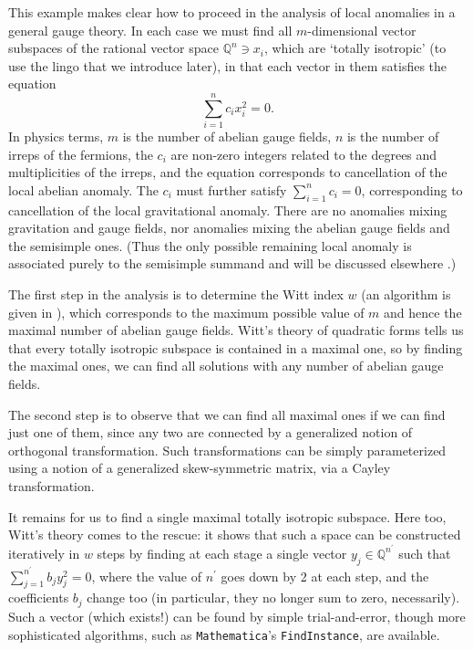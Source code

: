 \documentclass[11pt,a4paper]{article}
\begin{document}
This example makes clear how to proceed in the analysis of local anomalies in a general gauge theory. In each case we must find all $m$-dimensional vector subspaces of the rational vector space $\mathbb{Q}^n \ni x_i$, which are `totally isotropic' (to use the lingo that we introduce later), in that each vector in them satisfies the equation
\begin{equation}
	\sum_{i=1}^n c_i x_i^2 = 0.\label{equation:quaddiophantine}
\end{equation}
In physics terms, $m$ is the number of abelian gauge fields, $n$ is the number of irreps of the fermions, the $c_i$ are non-zero integers related to the degrees and multiplicities of the irreps, and the equation corresponds to cancellation of the local abelian anomaly.
The $c_i$ must further satisfy $\sum_{i=1}^n c_i = 0$, corresponding to cancellation of the local gravitational anomaly. There are no anomalies mixing gravitation and gauge fields, nor anomalies mixing the abelian gauge fields and the semisimple ones. (Thus the only possible remaining local anomaly is associated purely to the semisimple summand and will be discussed elsewhere \cite{gripaios_toappear}.)

The first step in the analysis is to determine the Witt index $w$ (an algorithm is given in \cite{Beale1989}),
which corresponds to the maximum possible value of $m$ and hence the maximal number of abelian gauge fields. Witt's theory of quadratic forms tells us that every totally isotropic subspace is contained in a maximal one,
so by finding the maximal ones, we can find all solutions with any number of abelian gauge fields.

The second step is to observe that we can find all maximal ones if we can find just one of them, since any two are connected by a generalized notion of orthogonal transformation. Such transformations can be simply parameterized using a notion of a generalized skew-symmetric matrix, via a Cayley transformation. 

It remains for us to find a single maximal totally isotropic subspace. Here too, Witt's theory comes to the rescue: it shows that such a space can be constructed iteratively in $w$ steps by finding at each stage a single vector $y_j \in \mathbb{Q}^{n^\prime}$ such that $\sum_{j=1}^{n^\prime} b_j y_j^2 = 0$, where the value of $n^\prime$ goes down by 2 at each step, and the coefficients $b_j$ change too (in particular, they no longer sum to zero, necessarily). Such a vector (which exists!) can be found by simple trial-and-error, though more sophisticated algorithms, such as {\tt Mathematica}'s {\tt FindInstance}, are available.
\end{document}

